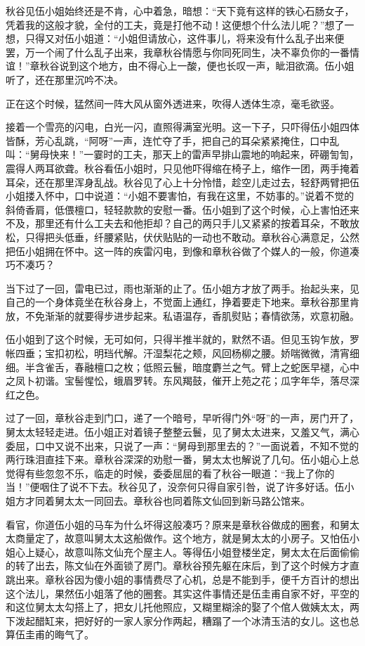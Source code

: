 \documentclass[12pt,UTF8]{ctexbook}
\begin{document}
{{{秋谷见伍小姐始终还是不肯，心中着急，暗想：“天下竟有这样的铁心石肠女子，凭着我的这般才貌，全付的工夫，竟是打他不动！这便想个什么法儿呢？”想了一想，只得又对伍小姐道：“小姐但请放心，这件事儿，将来没有什么乱子出来便罢，万一个闹了什么乱子出来，我章秋谷情愿与你同死同生，决不辜负你的一番情谊！”章秋谷说到这个地方，由不得心上一酸，便也长叹一声，眦泪欲滴。伍小姐听了，还在那里沉吟不决。

正在这个时候，猛然间一阵大风从窗外透进来，吹得人透体生凉，毫毛欲竖。

接着一个雪亮的闪电，白光一闪，直照得满室光明。这一下子，只吓得伍小姐四体皆酥，芳心乱跳，“阿呀”一声，连忙夺了手，把自己的耳朵紧紧掩住，口中乱叫：“舅母快来！”一霎时的工夫，那天上的雷声早排山震地的响起来，砰硼訇訇，震得人两耳欲聋。秋谷看伍小姐时，只见他吓得缩在椅子上，缩作一团，两手掩着耳朵，还在那里浑身乱战。秋谷见了心上十分怜惜，趁空儿走过去，轻舒两臂把伍小姐搂入怀中，口中说道：“小姐不要害怕，有我在这里，不妨事的。”说着不觉的斜倚香肩，低偎檀口，轻轻款款的安慰一番。伍小姐到了这个时候，心上害怕还来不及，那里还有什么工夫去和他拒却？自己的两只手儿又紧紧的按着耳朵，不敢放松，只得把头低垂，纤腰紧贴，伏伏贴贴的一动也不敢动。章秋谷心满意足，公然把伍小姐拥在怀中。这一阵的疾雷闪电，到像和章秋谷做了个媒人的一般，你道凑巧不凑巧？

当下过了一回，雷电已过，雨也渐渐的止了。伍小姐方才放了两手。抬起头来，见自己的一个身体竟坐在秋谷身上，不觉面上通红，挣着要走下地来。章秋谷那里肯放，不免渐渐的就要得步进步起来。私语温存，香肌熨贴；春情欲荡，欢意初融。

伍小姐到了这个时候，无可如何，只得半推半就的，默然不语。但见玉钩乍放，罗帐四垂；宝扣初松，明珰代解。汗湿梨花之颊，风回杨柳之腰。娇喘微微，清宵细细。半含雀舌，春融檀口之枚；低照云鬟，暗度麝兰之气。臂上之蛇医早褪，心中之凤卜初谐。宝髻惺忪，蛾眉罗转。东风羯鼓，催开上苑之花；瓜字年华，落尽深红之色。

过了一回，章秋谷走到门口，递了一个暗号，早听得门外“呀”的一声，房门开了，舅太太轻轻走进。伍小姐正对着镜子整整云鬟，见了舅太太进来，又羞又气，满心委屈，口中又说不出来，只说了一声：“舅母到那里去的？”一面说着，不知不觉的两行珠泪直挂下来。章秋谷深深的劝慰一番，舅太太也解说了几句。伍小姐心上总觉得有些忽忽不乐，临走的时候，委委屈屈的看了秋谷一眼道：“我上了你的当！”便咽住了说不下去。秋谷见了，没奈何只得自家引咎，说了许多好话。伍小姐方才同着舅太太一同回去。章秋谷也同着陈文仙回到新马路公馆来。

看官，你道伍小姐的马车为什么坏得这般凑巧？原来是章秋谷做成的圈套，和舅太太商量定了，故意叫舅太太这船做作。这个地方，就是舅太太的小房子。又怕伍小姐心上疑心，故意叫陈文仙充个屋主人。等得伍小姐登楼坐定，舅太太在后面偷偷的转了出去，陈文仙在外面锁了房门。章秋谷预先躯在床后，到了这个时候方才直跳出来。章秋谷因为傻小姐的事情费尽了心机，总是不能到手，便千方百计的想出这个法儿，果然伍小姐落了他的圈套。其实这件事情还是伍圭甫自家不好，平空的和这位舅太太勾搭上了，把女儿托他照应，又糊里糊涂的娶了个倌人做姨太太，两下泼起醋缸来，把好好的一家人家分作两起，糟蹋了一个冰清玉洁的女儿。这也总算伍圭甫的晦气了。

}}}
\end{document}

